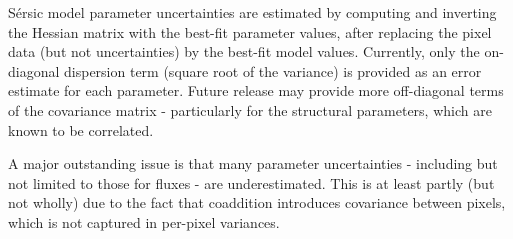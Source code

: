 S\'ersic model parameter uncertainties are estimated by computing and inverting the Hessian matrix with the best-fit parameter values, after replacing the pixel data (but not uncertainties) by the best-fit model values.
Currently, only the on-diagonal dispersion term (square root of the variance) is provided as an error estimate for each parameter.
Future release may provide more off-diagonal terms of the covariance matrix - particularly for the structural parameters, which are known to be correlated.

A major outstanding issue is that many parameter uncertainties - including but not limited to those for fluxes - are underestimated.
This is at least partly (but not wholly) due to the fact that coaddition introduces covariance between pixels, which is not captured in per-pixel variances.

